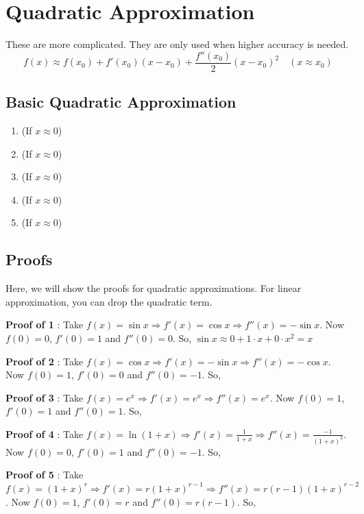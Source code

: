 \section{Quadratic Approximation}

These are more complicated. They are only used when higher accuracy is needed.
$$ \boxed{
	f(x) \approx f(x_0) + f'(x_0)(x-x_0) + \frac{f''(x_0)}{2}(x-x_0)^2 \quad (x \approx x_0)
}$$

\subsection{Basic Quadratic Approximation}

\begin{enumerate}
	\item {} (If $x \approx 0$)
	\item {} (If $x \approx 0$)
	\item {} (If $x \approx 0$)
	\item {} (If $x \approx 0$)
	\item {} (If $x \approx 0$)
\end{enumerate}


\subsection*{Proofs}

Here, we will show the proofs for quadratic approximations.
For linear approximation, you can drop the quadratic term.

{\bf Proof of 1} : Take $ f(x) = \sin x \Rightarrow f'(x) = \cos x \Rightarrow f''(x) = - \sin x $.
Now $f(0) = 0$, $f'(0) = 1$ and $f''(0) = 0$.
So, $ \sin x \approx 0 + 1 \cdot x + 0 \cdot x^2 = x $

{\bf Proof of 2} : Take $ f(x) = \cos x \Rightarrow f'(x) = -\sin x \Rightarrow f''(x) = - \cos x $.
Now $f(0) = 1$, $f'(0) = 0$ and $f''(0) = -1$.
So, 

{\bf Proof of 3} : Take $ f(x) = e^x \Rightarrow f'(x) = e^x \Rightarrow f''(x) = e^x $.
Now $f(0) = 1$, $f'(0) = 1$ and $f''(0) = 1$.
So, 

{\bf Proof of 4} : Take $ f(x) = \ln(1+x) \Rightarrow f'(x) = \frac{1}{1+x} \Rightarrow f''(x) = \frac{-1}{(1+x)^2} $.
Now $f(0) = 0$, $f'(0) = 1$ and $f''(0) = -1$.
So, 

{\bf Proof of 5} : Take $ f(x) = (1+x)^r \Rightarrow f'(x) = r(1+x)^{r-1} \Rightarrow f''(x) = r(r-1)(1+x)^{r-2} $.
Now $f(0) = 1$, $f'(0) = r$ and $f''(0) = r(r-1)$.
So, 


